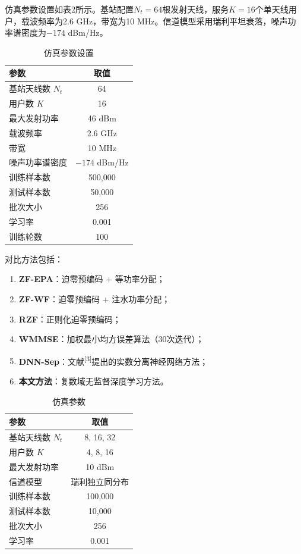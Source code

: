 \documentclass[twoside, 10pt]{ctexart}
\newcommand{\upcite}[1]{\textsuperscript{[#1]}}\newcommand{\normalcite}[1]{[#1]}
\begin{document}
仿真参数设置如表2所示。基站配置$N_t = 64$根发射天线，服务$K = 16$个单天线用户，载波频率为2.6 GHz，带宽为10 MHz。信道模型采用瑞利平坦衰落，噪声功率谱密度为$-174$ dBm/Hz。

\begin{table}[htbp]
\centering
\caption{仿真参数设置}
\label{tab:sim_params}
{\fontsize{7.5pt}{9pt}\selectfont
\begin{tabular}{lc}
\toprule
参数 & 取值 \\
\midrule
基站天线数 $N_t$ & 64 \\
用户数 $K$ & 16 \\
最大发射功率 & 46 dBm \\
载波频率 & 2.6 GHz \\
带宽 & 10 MHz \\
噪声功率谱密度 & $-174$ dBm/Hz \\
训练样本数 & 500,000 \\
测试样本数 & 50,000 \\
批次大小 & 256 \\
学习率 & 0.001 \\
训练轮数 & 100 \\
\bottomrule
\end{tabular}}
\end{table}

对比方法包括：
\begin{enumerate}[label=\arabic*), topsep=0pt, partopsep=0pt, itemsep=-5pt]
    \item \textbf{ZF-EPA}：迫零预编码 + 等功率分配；
    \item \textbf{ZF-WF}：迫零预编码 + 注水功率分配；
    \item \textbf{RZF}：正则化迫零预编码；
    \item \textbf{WMMSE}：加权最小均方误差算法（30次迭代）；
    \item \textbf{DNN-Sep}：文献\upcite{3}提出的实数分离神经网络方法；
    \item \textbf{本文方法}：复数域无监督深度学习方法。
\end{enumerate}

\begin{table}[htbp]
\centering
\caption{仿真参数}
\label{tab:param}
{\fontsize{7.5pt}{9pt}\selectfont
\begin{tabular}{lc}
\toprule
参数 & 取值 \\
\midrule
基站天线数 $N_t$ & 8, 16, 32 \\
用户数 $K$ & 4, 8, 16 \\
最大发射功率 & 10 dBm \\
信道模型 & 瑞利独立同分布 \\
训练样本数 & 100,000 \\
测试样本数 & 10,000 \\
批次大小 & 256 \\
学习率 & 0.001 \\
\bottomrule
\end{tabular}}
\end{table}
\end{document}
